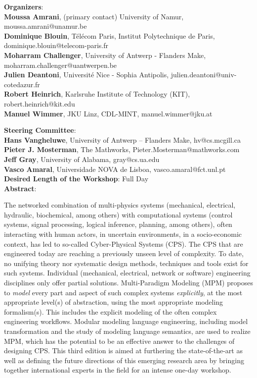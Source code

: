 \noindent
\textbf{Organizers}:\\
\textbf{Moussa Amrani}, (primary contact) University of Namur, moussa.amrani@unamur.be\\
\textbf{Dominique Blouin}, T\'el\'ecom Paris, Institut Polytechnique de Paris, dominique.blouin@telecom-paris.fr\\
\textbf{Moharram Challenger}, University of Antwerp - Flanders Make, moharram.challenger@uantwerpen.be\\
\textbf{Julien Deantoni}, Universit\'e Nice - Sophia Antipolis, julien.deantoni@univ-cotedazur.fr\\
\textbf{Robert Heinrich}, Karlsruhe Institute of Technology (KIT), robert.heinrich@kit.edu\\
\textbf{Manuel Wimmer}, JKU Linz, CDL-MINT, manuel.wimmer@jku.at

\bigskip
\noindent
\textbf{Steering Committee}:\\
\textbf{Hans Vangheluwe}, University of Antwerp – Flanders Make, hv@cs.mcgill.ca\\
\textbf{Pieter J. Mosterman}, The Mathworks, Pieter.Mosterman@mathworks.com\\
\textbf{Jeff Gray}, University of Alabama, gray@cs.ua.edu\\
\textbf{Vasco Amaral}, Universidade NOVA de Lisboa, vasco.amaral@fct.unl.pt\\


\noindent
\textbf{Desired Length of the Workshop}: Full Day \\

\noindent
\textbf{Abstract}: 
\begin{small}
The networked combination of multi-physics systems (mechanical, 
electrical, hydraulic, biochemical, among others) with computational systems 
(control systems, signal processing, logical inference, planning, among others), 
often interacting with human actors, in uncertain environments, in a socio-economic 
context, has led to so-called Cyber-Physical Systems (CPS).
The CPS that are engineered today are reaching a previously unseen level of 
complexity.
To date, no unifying theory nor systematic design methods, techniques and tools 
exist for such systems.
Individual (mechanical, electrical, network or software) engineering disciplines 
only offer partial solutions.
Multi-Paradigm Modeling (MPM) proposes to \emph{model} every part and aspect of 
such complex systems \emph{explicitly}, at the most appropriate level(s) of 
abstraction, using the most appropriate modeling formalism(s).
This includes the explicit modeling of the often complex engineering workflows.
Modular modeling language engineering, including model transformation and the 
study of modeling language semantics, are used to realize MPM, which has the 
potential to be an effective answer to the challenges of designing CPS.
This third edition is aimed at furthering the state-of-the-art as well as 
defining the future directions of this emerging research area by bringing together 
international experts in the field for an intense one-day workshop.
\end{small}

